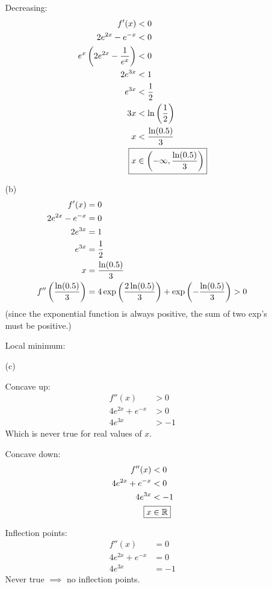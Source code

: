 \documentclass{article}
\newcommand*{\paren}[1]{\ensuremath\left(#1\right)}
\begin{document}
\begin{itemize}
\begin{itemize}
\begin{multicols}{2}
			\columnbreak

			Decreasing:
			\begin{align*}
				f'(x)&<0 \\
				2e^{2x}-e^{-x}&<0 \\
				e^x\paren{2e^{2x}-\frac{1}{e^x}}&<0 \\
				2e^{3x}&<1 \\
				e^{3x}&<\frac{1}{2} \\
				3x&<\ln\paren{\frac{1}{2}} \\
				x&<\frac{\ln(0.5)}{3} \\
				\Aboxed{x&\in\paren{-\infty,\frac{\ln(0.5)}{3}}}
			\end{align*}
		\end{multicols}

		\item[(b)]
		\begin{align*}
			f'(x)&=0 \\
			2e^{2x}-e^{-x}&=0 \\
			2e^{3x}&=1 \\
			e^{3x}&=\frac{1}{2} \\
			x&=\frac{\ln(0.5)}{3} \\
			f''\paren{\frac{\ln(0.5)}{3}}&=4\exp\paren{\frac{2\ln(0.5)}{3}}+\exp\paren{-\frac{\ln(0.5)}{3}}>0
		\end{align*}
		(since the exponential function is always positive, the sum of two exp's must be positive.)

		Local minimum: 
	
		\item[(c)]
		\begin{multicols}{2}
			Concave up:
			\begin{align*}
				f''(x)&>0 \\
				4e^{2x}+e^{-x}&>0 \\
				4e^{3x}&>-1
			\end{align*}
			Which is never true for real values of $x$.

			\columnbreak

			Concave down:
			\begin{align*}
				f''(x)&<0 \\
				4e^{2x}+e^{-x}&<0 \\
				4e^{3x}&<-1 \\
				\Aboxed{x&\in\mathbb{R}}
			\end{align*}
		\end{multicols}
		Inflection points:
		\begin{align*}
			f''(x)&=0 \\
			4e^{2x}+e^{-x}&=0 \\
			4e^{3x}&=-1
		\end{align*}
		Never true $\implies$ no inflection points.
	\end{itemize}


\end{itemize}
\end{document}
